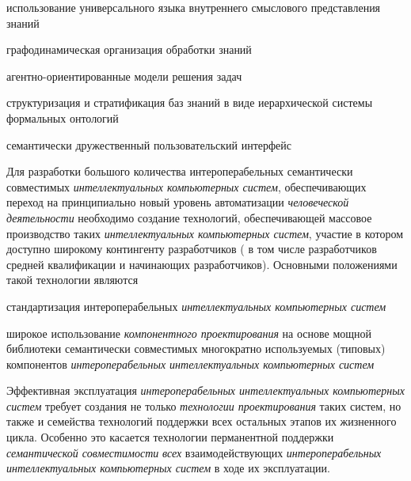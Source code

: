 \begin{textitemize}
\begin{textitemize}
		\item использование универсального языка внутреннего смыслового представления знаний
		\item графодинамическая организация обработки знаний
		\item агентно-ориентированные модели решения задач
		\item структуризация и стратификация баз знаний в виде иерархической системы формальных онтологий
		\item семантически дружественный пользовательский интерфейс
	\end{textitemize}
	\item Для разработки большого количества интероперабельных семантически совместимых \textit{интеллектуальных компьютерных систем}, обеспечивающих переход на принципиально новый уровень автоматизации \textit{человеческой деятельности} необходимо создание технологий, обеспечивающей массовое производство таких \textit{интеллектуальных компьютерных систем}, участие в котором доступно широкому контингенту разработчиков ( в том числе разработчиков средней квалификации и начинающих разработчиков). Основными положениями такой технологии являются
	\begin{textitemize}
		\item стандартизация интероперабельных \textit{интеллектуальных компьютерных систем}
		\item широкое использование \textit{компонентного проектирования} на основе мощной библиотеки семантически совместимых многократно используемых (типовых) компонентов \textit{интероперабельных интеллектуальных компьютерных систем}
	\end{textitemize}
	\item Эффективная эксплуатация \textit{интероперабельных интеллектуальных компьютерных систем} требует создания не только \textit{технологии проектирования} таких систем, но также и семейства технологий поддержки всех остальных этапов их жизненного цикла. Особенно это касается технологии перманентной поддержки \textit{семантической совместимости} \textit{всех} взаимодействующих \textit{интероперабельных интеллектуальных компьютерных систем} в ходе их эксплуатации.
\end{textitemize}

%